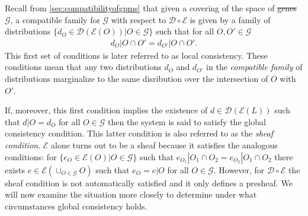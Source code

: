 \documentclass[10pt]{article}
\def\dist{\mathcal{D}}
\providecommand{\DIFaddtex}[1]{{\protect\color{blue}\uwave{#1}}} %
\providecommand{\DIFdeltex}[1]{{\protect\color{red}\sout{#1}}}                      %
\providecommand{\DIFaddbegin}{} %
\providecommand{\DIFaddend}{} %
\providecommand{\DIFdelbegin}{} %
\providecommand{\DIFdelend}{} %
\providecommand{\DIFadd}[1]{\texorpdfstring{\DIFaddtex{#1}}{#1}} %
\providecommand{\DIFdel}[1]{\texorpdfstring{\DIFdeltex{#1}}{}} %
\begin{document}
\DIFaddend Recall from \ref{sec:compatibilityofgpms} that given a covering of the space of \DIFdelbegin \DIFdel{genes }\DIFdelend \DIFaddbegin \DIFadd{variables }\DIFaddend $\mathcal{G}$, a compatible family for $\mathcal{G}$ with respect to $\mathcal{D} \circ \mathcal{E}$ is given by a family of distributions $\{d_O \in \dist (\mathcal{E}(O)) | O \in \mathcal{G}\}$ such that for all $O, O' \in \mathcal{G}$
\begin{eqnarray}
d_O|O \cap O' = d_{O'}|O \cap O'.
\end{eqnarray}
This first set of conditions is later referred to as local consistency. These conditions mean that any two distributions $d_O$ and $d_{O'}$ in the \emph{compatible family} of distributions marginalize to the same disribution over the intersection of $O$ with $O'$.

If, moreover, this first condition implies the existence of $d \in \mathcal{D}( \mathcal{E}(L))$ such that $d|O = d_O$ for all $O \in \mathcal{G}$ then the system is said to satisfy the global consistency condition.  This latter condition is also referred to as the \emph{sheaf condition}.  $\mathcal{E}$ alone turns out to be a sheaf because it satisfies the analogous conditions: for $\{e_O \in \mathcal{E}(O) | O \in \mathcal{G}\}$ such that $e_{O_{1}} | O_1 \cap O_2 = e_{O_{2}} | O_1 \cap O_2$ there exists $e \in \mathcal{E}(\cup_{O \in \mathcal{G}} O)$ such that $e_O = e|O$ for all $O \in \mathcal{G}$.  However, for $\dist \circ \mathcal{E}$ the sheaf condition is not automatically satisfied and it only defines a presheaf.  We will now examine the situation more closely to determine under what circumstances global consistency holds.
\end{document}
